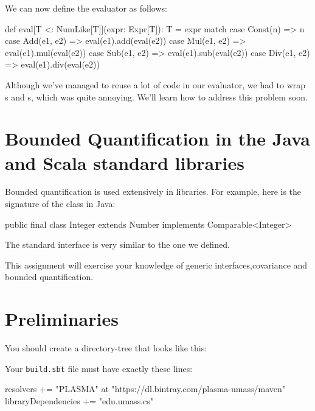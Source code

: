 \documentclass{book}
\begin{document}
We can now define the evaluator as follows:

\begin{scalacode}
def eval[T <: NumLike[T]](expr: Expr[T]): T = expr match {
  case Const(n) => n
  case Add(e1, e2) => eval(e1).add(eval(e2))
  case Mul(e1, e2) => eval(e1).mul(eval(e2))
  case Sub(e1, e2) => eval(e1).sub(eval(e2))
  case Div(e1, e2) => eval(e1).div(eval(e2))
}
\end{scalacode}

Although we've managed to reuse a lot of code in our evaluator,
we had to wrap s and s, which was
quite annoying. We'll learn how to address this problem soon.

\section{Bounded Quantification in the Java and Scala standard libraries}

Bounded quantification is used extensively in libraries. For example,
here is the signature of the  class in Java:

\begin{scalacode}
public final class Integer extends Number implements Comparable<Integer>
\end{scalacode}

The standard  interface is very similar to the one we
defined.


This assignment will exercise your knowledge of generic interfaces,covariance
and bounded quantification.

\section{Preliminaries}

You should create a directory-tree that looks like this:


Your \texttt{build.sbt} file must have exactly these lines:

\begin{scalacode}
resolvers += "PLASMA" at "https://dl.bintray.com/plasma-umass/maven"
libraryDependencies += "edu.umass.cs" %
\end{scalacode}
\end{document}
